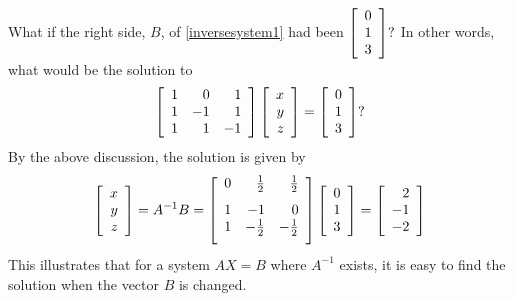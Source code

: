 What if the right side, $B$,  of \ref{inversesystem1} had been $\left[
\begin{array}{r}
0 \\
1 \\
3
\end{array}
\right] ?$ In other words, what would be the solution to
\begin{equation*}
\left[
\begin{array}{rrr}
1 & 0 & 1 \\
1 & -1 & 1 \\
1 & 1 & -1
\end{array}
\right] \left[
\begin{array}{r}
x \\
y \\
z
\end{array}
\right] =\left[
\begin{array}{r}
0 \\
1 \\
3
\end{array}
\right] ?
\end{equation*}
By the above discussion, the solution is given by 
\begin{equation*}
\leftB
\begin{array}{r}
x \\
y \\
z
\end{array}
\rightB = A^{-1}B = \leftB
\begin{array}{rrr}
0 & \vspace{0.05in}\frac{1}{2} & \vspace{0.05in}\frac{1}{2} \\
1 & -1 & 0 \\
1 & -\vspace{0.05in}\frac{1}{2} & -\vspace{0.05in}\frac{1}{2}
\end{array}
\rightB \leftB
\begin{array}{r}
0 \\
1 \\
3
\end{array}
\rightB =\leftB
\begin{array}{r}
2 \\
-1 \\
-2
\end{array}
\rightB 
\end{equation*}
This illustrates that for a system $AX=B$ where $A^{-1}$ exists, 
it is easy to find the solution when the vector $B$ is changed.


